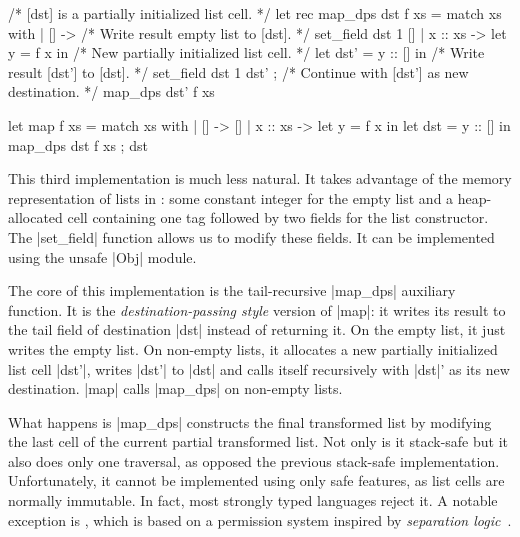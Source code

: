 \begin{minipage}{0.65\linewidth}
\begin{Ocaml}
/* [dst] is a partially initialized list cell. */
let rec map_dps dst f xs =
  match xs with
  | [] ->
      /* Write result empty list to [dst]. */
      set_field dst 1 []
  | x :: xs ->
      let y = f x in
      /* New partially initialized list cell. */
      let dst' = y :: [] in
      /* Write result [dst'] to [dst]. */
      set_field dst 1 dst' ;
      /* Continue with [dst'] as new destination. */
      map_dps dst' f xs
\end{Ocaml}
\end{minipage}
\hfill
\begin{minipage}{0.45\linewidth}
\begin{Ocaml}
let map f xs =
  match xs with
  | [] ->
      []
  | x :: xs ->
      let y = f x in
      let dst = y :: [] in
      map_dps dst f xs ;
      dst
\end{Ocaml}
\end{minipage}

This third implementation is much less natural.
%
It takes advantage of the memory representation of lists in \OCaml: some constant integer for the empty list and a heap-allocated cell containing one tag followed by two fields for the list constructor.
%
The \ocaml|set_field| function allows us to modify these fields.
%
It can be implemented using the unsafe \ocaml|Obj| module.

The core of this implementation is the tail-recursive \ocaml|map_dps| auxiliary function.
%
It is the \emph{destination-passing style} version of \ocaml|map|: it writes its result to the tail field of destination \ocaml|dst| instead of returning it.
%
On the empty list, it just writes the empty list.
%
On non-empty lists, it allocates a new partially initialized list cell \ocaml|dst'|, writes \ocaml|dst'| to \ocaml|dst| and calls itself recursively with \ocaml|dst|' as its new destination.
%
\ocaml|map| calls \ocaml|map_dps| on non-empty lists.

What happens is \ocaml|map_dps| constructs the final transformed list by modifying the last cell of the current partial transformed list.
%
Not only is it stack-safe but it also does only one traversal, as opposed the previous stack-safe implementation.
%
Unfortunately, it cannot be implemented using only safe \OCaml features, as list cells are normally immutable.
%
In fact, most strongly typed languages reject it.
%
A notable exception is \Mezzo \cite{DBLP:journals/toplas/BalabonskiPP16}, which is based on a permission system inspired by \emph{separation logic}~\cite{DBLP:journals/cacm/OHearn19}.


